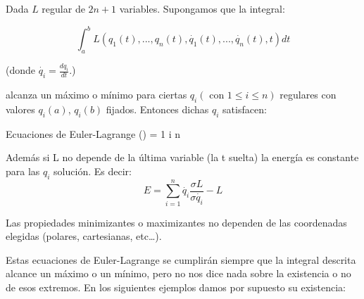 \begin{prop}
Dada $L$ regular de $2n + 1$ variables. Supongamos que la integral:

 $$\int_a^b L(q_1(t),...,q_n(t),\dot{q_1}(t),...,\dot{q_n}(t),t) dt$$

 (donde $\dot{q_i} = \frac{dq_i}{dt}$.)

 alcanza un máximo o mínimo para ciertas $q_i (\text{ con } 1\leq i \leq n)$ regulares con valores $q_i(a)$, $q_i(b)$ fijados. Entonces dichas $q_i$ satisfacen:


\begin{op}{Ecuaciones de Euler-Lagrange}
 \left(\right) =   1 \leq i \leq n
\end{op}

Además si L no depende de la última variable (la t suelta) la energía es constante para las $q_i$ solución. Es decir:
\[E = \sum_{i=1}^n \dot{q_i} \frac{\sigma L}{\sigma \dot{q_i}} - L\]

Las propiedades minimizantes o maximizantes no dependen de las coordenadas elegidas (polares, cartesianas, etc…).

\end{prop}

Estas ecuaciones de Euler-Lagrange se cumplirán siempre que la integral descrita alcance un máximo o un mínimo, pero no nos dice nada sobre la existencia o no de esos extremos. En los  siguientes ejemplos damos por supuesto su existencia:

